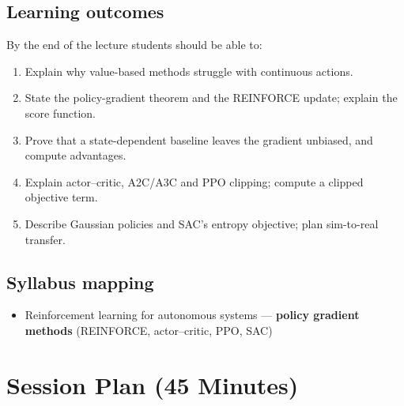 \documentclass[11pt]{article}
\begin{document}
\subsection*{Learning outcomes}By the end of the lecture students should be able to:\begin{enumerate}\item Explain why value-based methods struggle with continuous actions.\item State the policy-gradient theorem and the REINFORCE update; explain the score function.\item Prove that a state-dependent baseline leaves the gradient unbiased, and compute advantages.\item Explain actor--critic, A2C/A3C and PPO clipping; compute a clipped objective term.\item Describe Gaussian policies and SAC's entropy objective; plan sim-to-real transfer.\end{enumerate}

\subsection*{Syllabus mapping}\begin{itemize}\item Reinforcement learning for autonomous systems --- \textbf{policy gradient methods} (REINFORCE, actor--critic, PPO, SAC)\end{itemize}

\section{Session Plan (45 Minutes)}
\end{document}
